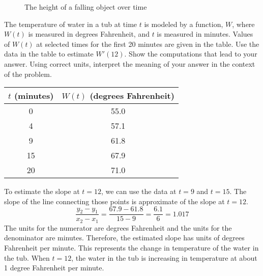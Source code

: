\begin{figure}[htbp]
    \centering
    \caption{The height of a falling object over time}
    \label{fig:falling}
\end{figure}

\begin{Exercise} The temperature of water in a tub 
	at time $t$ is modeled by a function, $W$, where $W(t)$ is measured in degrees 
	Fahrenheit, and $t$ is measured in minutes. Values of $W(t)$ at selected times 
	for the first 20 minutes are given in the table. Use the data in the table to 
	estimate $W'(12)$. Show the computations that lead to your answer. Using 
	correct units, interpret the meaning of your answer in the context of the 
	problem. \\
	\begin{tabular}{c|c}\hline
	$t$ (minutes) & $W(t)$ (degrees Fahrenheit)\\
	\hline
	0 & 55.0\\
	\hline
	4 & 57.1\\
	\hline
	9 & 61.8\\
	\hline
	15 & 67.9\\
	\hline
	20 & 71.0\\
	\hline
	\end{tabular}	 
\end{Exercise}

\begin{Answer}[ref=slope1]
	To estimate the slope at $t = 12$, we can use the data at $t = 9$ and $t = 
	15$. The slope of the line connecting those points is approximate of the 
	slope at $t = 12$. $$\frac{y_2 - y_1}{x_2 - x_1} = \frac{67.9 - 61.8}{15 - 9} 
	= \frac{6.1}{6} = 1.017$$ The units for the numerator are degrees Fahrenheit 
	and the units for the denominator are minutes. Therefore, the estimated slope has units 
	of degrees Fahrenheit per minute. This represents the change in temperature 
	of the water in the tub. When $t = 12$, the water in the tub is increasing in 
	temperature at about 1 degree Fahrenheit per minute. 
\end{Answer}

